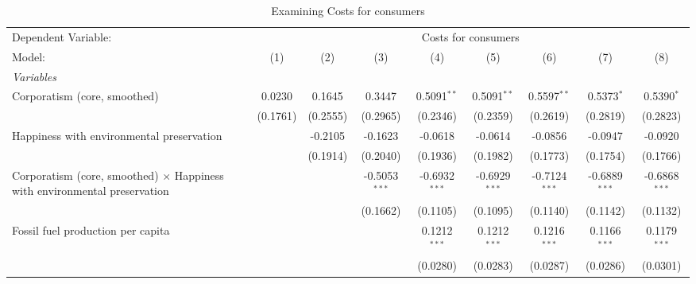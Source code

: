 
\begin{table}[htbp]
   \caption{Examining Costs for consumers}
   \centering
   \begin{tabular}{lcccccccc}
      \tabularnewline \midrule \midrule
      Dependent Variable: & \multicolumn{8}{c}{Costs for consumers}\\
      Model:                                                                           & (1)      & (2)      & (3)             & (4)             & (5)             & (6)             & (7)             & (8)\\  
      \midrule
      \emph{Variables}\\
      Corporatism (core, smoothed)                                                     & 0.0230   & 0.1645   & 0.3447          & 0.5091$^{**}$   & 0.5091$^{**}$   & 0.5597$^{**}$   & 0.5373$^{*}$    & 0.5390$^{*}$\\   
                                                                                       & (0.1761) & (0.2555) & (0.2965)        & (0.2346)        & (0.2359)        & (0.2619)        & (0.2819)        & (0.2823)\\   
      Happiness with environmental preservation                                        &          & -0.2105  & -0.1623         & -0.0618         & -0.0614         & -0.0856         & -0.0947         & -0.0920\\   
                                                                                       &          & (0.1914) & (0.2040)        & (0.1936)        & (0.1982)        & (0.1773)        & (0.1754)        & (0.1766)\\   
      Corporatism (core, smoothed) $\times$ Happiness with environmental preservation  &          &          & -0.5053$^{***}$ & -0.6932$^{***}$ & -0.6929$^{***}$ & -0.7124$^{***}$ & -0.6889$^{***}$ & -0.6868$^{***}$\\   
                                                                                       &          &          & (0.1662)        & (0.1105)        & (0.1095)        & (0.1140)        & (0.1142)        & (0.1132)\\   
      Fossil fuel production per capita                                                &          &          &                 & 0.1212$^{***}$  & 0.1212$^{***}$  & 0.1216$^{***}$  & 0.1166$^{***}$  & 0.1179$^{***}$\\   
                                                                                       &          &          &                 & (0.0280)        & (0.0283)        & (0.0287)        & (0.0286)        & (0.0301)\\   

\end{tabular}
\end{table}
